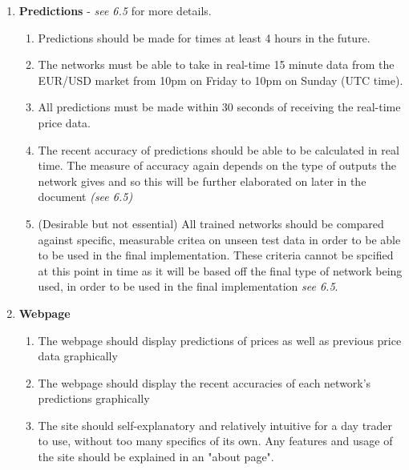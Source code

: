     \begin{enumerate}
        \item \textbf{Predictions} - \textit{see 6.5} for more details.
        
        \begin{enumerate}
            \item Predictions should be made for times at least 4 hours in the future.
            
            \item The networks must be able to take in real-time 15 minute data from the EUR/USD market from 10pm on Friday to 10pm on Sunday (UTC time).
            
            \item All predictions must be made within 30 seconds of receiving the real-time price data. 
            
            \item The recent accuracy of predictions should be able to be calculated in real time. The measure of accuracy again depends on the type of outputs the network gives and so this will be further elaborated on later in the document \textit{(see 6.5)}
            
            \item (Desirable but not essential) All trained networks should be compared against specific, measurable critea on unseen test data in order to be able to be used in the final implementation. These criteria cannot be spcified at this point in time as it will be based off the final type of network being used, in order to be used in the final implementation \textit{see 6.5}.
        
        \end{enumerate}

        \item \textbf{Webpage}
        
        \begin{enumerate}
            \item The webpage should display predictions of prices as well as previous price data graphically
            
            \item The webpage should display the recent accuracies of each network's predictions graphically
            
            \item The site should self-explanatory and relatively intuitive for a day trader to use, without too many specifics of its own. Any features and usage of the site should be explained in an "about page".
        \end{enumerate}


\end{enumerate}
